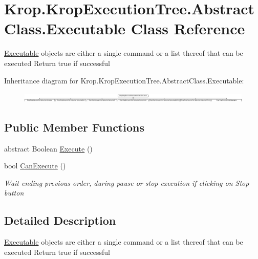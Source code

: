 \hypertarget{class_krop_1_1_krop_execution_tree_1_1_abstract_class_1_1_executable}{}\section{Krop.\+Krop\+Execution\+Tree.\+Abstract\+Class.\+Executable Class Reference}
\label{class_krop_1_1_krop_execution_tree_1_1_abstract_class_1_1_executable}


\mbox{\hyperlink{class_krop_1_1_krop_execution_tree_1_1_abstract_class_1_1_executable}{Executable}} objects are either a single command or a list thereof that can be executed Return true if successful  


Inheritance diagram for Krop.\+Krop\+Execution\+Tree.\+Abstract\+Class.\+Executable\+:\begin{figure}[H]
\begin{center}
\leavevmode
\includegraphics[height=0.496894cm]{class_krop_1_1_krop_execution_tree_1_1_abstract_class_1_1_executable}
\end{center}
\end{figure}
\subsection*{Public Member Functions}
\begin{DoxyCompactItemize}
\item 
abstract Boolean \mbox{\hyperlink{class_krop_1_1_krop_execution_tree_1_1_abstract_class_1_1_executable_ac32692ce44b5f938a90111ee27e7b684}{Execute}} ()
\item 
bool \mbox{\hyperlink{class_krop_1_1_krop_execution_tree_1_1_abstract_class_1_1_executable_a6a68e24e46c40a04ac71c7d71bbc2abd}{Can\+Execute}} ()
\begin{DoxyCompactList}\small\item\em Wait ending previous order, during pause or stop execution if clicking on Stop button \end{DoxyCompactList}\end{DoxyCompactItemize}


\subsection{Detailed Description}
\mbox{\hyperlink{class_krop_1_1_krop_execution_tree_1_1_abstract_class_1_1_executable}{Executable}} objects are either a single command or a list thereof that can be executed Return true if successful 



